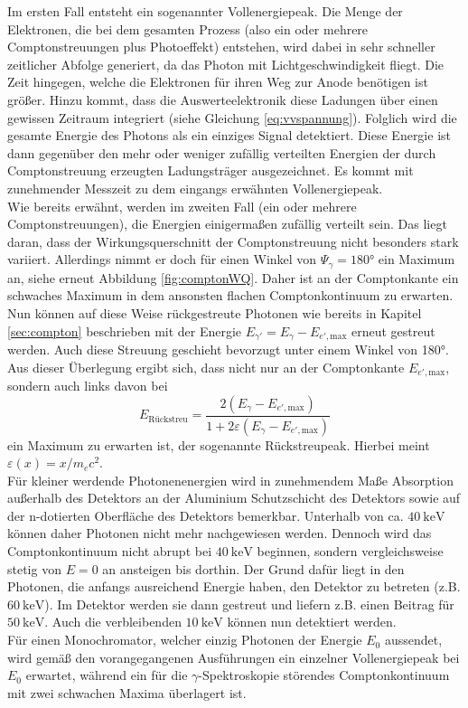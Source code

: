 Im ersten Fall entsteht ein sogenannter Vollenergiepeak. Die Menge der Elektronen, die bei dem gesamten Prozess (also ein oder mehrere Comptonstreuungen plus Photoeffekt) entstehen, wird dabei in sehr schneller zeitlicher Abfolge generiert, da das Photon mit Lichtgeschwindigkeit fliegt. Die Zeit hingegen, welche die Elektronen für ihren Weg zur Anode benötigen ist größer. Hinzu kommt, dass die Auswerteelektronik diese Ladungen über einen gewissen Zeitraum integriert (siehe Gleichung \eqref{eq:vvspannung}). Folglich wird die gesamte Energie des Photons als ein einziges Signal detektiert. Diese Energie ist dann gegenüber den mehr oder weniger zufällig verteilten Energien der durch Comptonstreuung erzeugten Ladungsträger ausgezeichnet. Es kommt mit zunehmender Messzeit zu dem eingangs erwähnten Vollenergiepeak. \\
Wie bereits erwähnt, werden im zweiten Fall (ein oder mehrere Comptonstreuungen), die Energien einigermaßen zufällig verteilt sein. Das liegt daran, dass der Wirkungsquerschnitt der Comptonstreuung nicht besonders stark variiert. Allerdings nimmt er doch für einen Winkel von $\Psi_\gamma = 180°$ ein Maximum an, siehe erneut Abbildung \ref{fig:comptonWQ}. Daher ist an der Comptonkante ein schwaches Maximum in dem ansonsten flachen Comptonkontinuum zu erwarten. Nun können auf diese Weise rückgestreute Photonen wie bereits in Kapitel \ref{sec:compton} beschrieben mit der Energie $E_{\gamma'} = E_\gamma - E_{e',\text{max}}$ erneut gestreut werden. Auch diese Streuung geschieht bevorzugt unter einem Winkel von 180°. Aus dieser Überlegung ergibt sich, dass nicht nur an der Comptonkante $E_{e',\text{max}}$, sondern auch links davon bei
\begin{equation}
  E_\text{Rückstreu} = \frac{2(E_\gamma - E_{e',\text{max}}) }{1+2\varepsilon(E_\gamma - E_{e',\text{max}})}
  \label{Ruckstreu_wichtig}
\end{equation}
ein Maximum zu erwarten ist, der sogenannte Rückstreupeak. Hierbei meint $\varepsilon(x) = x/m_e c^2$.\\
Für kleiner werdende Photonenenergien wird in zunehmendem Maße Absorption außerhalb des Detektors an der Aluminium Schutzschicht des Detektors sowie auf der n-dotierten Oberfläche des Detektors bemerkbar. Unterhalb von ca. $\SI{40}{\kilo\electronvolt}$  können daher Photonen nicht mehr nachgewiesen werden. Dennoch wird das Comptonkontinuum nicht abrupt bei $\SI{40}{\kilo\electronvolt}$ beginnen, sondern vergleichsweise stetig von $E=0$ an ansteigen bis dorthin. Der Grund dafür liegt in den Photonen, die anfangs ausreichend Energie haben, den Detektor zu betreten (z.B. $\SI{60}{\kilo\electronvolt}$). Im Detektor werden sie dann gestreut und liefern z.B. einen Beitrag für $\SI{50}{\kilo\electronvolt}$. Auch die verbleibenden $\SI{10}{\kilo\electronvolt}$ können nun detektiert werden.\\
Für einen Monochromator, welcher einzig Photonen der Energie $E_0$ aussendet, wird gemäß den vorangegangenen Ausführungen ein einzelner Vollenergiepeak bei $E_0$ erwartet, während ein für die $\gamma$-Spektroskopie störendes Comptonkontinuum mit zwei schwachen Maxima überlagert ist.


